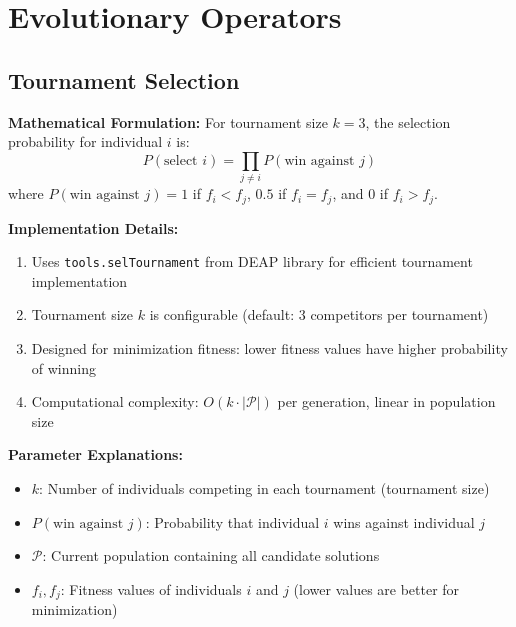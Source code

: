 \documentclass[12pt,a4paper]{article}
\begin{document}
\section{Evolutionary Operators}

\subsection{Tournament Selection}
\textbf{Mathematical Formulation:}
For tournament size $k=3$, the selection probability for individual $i$ is:
\begin{equation}
P(\text{select } i) = \prod_{j \neq i} P(\text{win against } j) \label{eq:tournament_selection}
\end{equation}
where $P(\text{win against } j) = 1$ if $f_i < f_j$, $0.5$ if $f_i = f_j$, and $0$ if $f_i > f_j$.

\textbf{Implementation Details:}
\begin{enumerate}
\item Uses \texttt{tools.selTournament} from DEAP library for efficient tournament implementation
\item Tournament size $k$ is configurable (default: 3 competitors per tournament)
\item Designed for minimization fitness: lower fitness values have higher probability of winning
\item Computational complexity: $O(k \cdot |\mathcal{P}|)$ per generation, linear in population size
\end{enumerate}

\textbf{Parameter Explanations:}
\begin{itemize}
\item $k$: Number of individuals competing in each tournament (tournament size)
\item $P(\text{win against } j)$: Probability that individual $i$ wins against individual $j$
\item $\mathcal{P}$: Current population containing all candidate solutions
\item $f_i, f_j$: Fitness values of individuals $i$ and $j$ (lower values are better for minimization)
\end{itemize}
\end{document}
